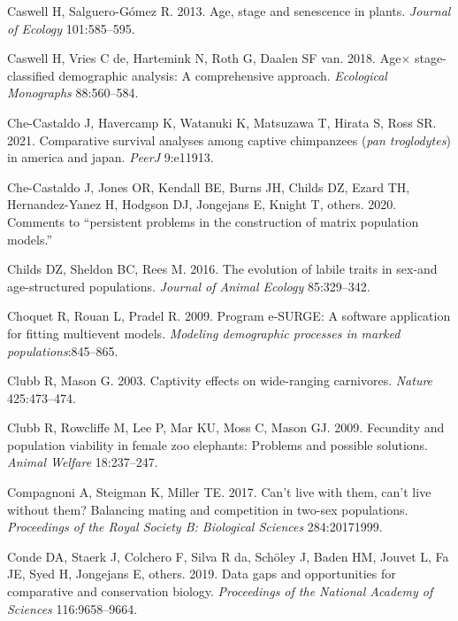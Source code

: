 \documentclass[
  12pt,
  letterpaper,
]{book}
\newlength{\cslhangindent}
\newenvironment{CSLReferences}[2] %
 {\begin{list}{}{%
  \setlength{\itemindent}{0pt}
  \setlength{\leftmargin}{0pt}
  \setlength{\parsep}{0pt}
  \ifodd #1
   \setlength{\leftmargin}{\cslhangindent}
   \setlength{\itemindent}{-1\cslhangindent}
  \fi
  \setlength{\itemsep}{#2\baselineskip}}}
 {\end{list}}
\begin{document}
\begin{CSLReferences}{1}{0}
Caswell H, Salguero-Gómez R. 2013. Age, stage and senescence in plants.
\emph{Journal of Ecology} 101:585--595.

Caswell H, Vries C de, Hartemink N, Roth G, Daalen SF van. 2018.
Age\(\times\) stage-classified demographic analysis: A comprehensive
approach. \emph{Ecological Monographs} 88:560--584.

Che-Castaldo J, Havercamp K, Watanuki K, Matsuzawa T, Hirata S, Ross SR.
2021. Comparative survival analyses among captive chimpanzees (\emph{pan
{t}roglodytes}) in america and japan. \emph{PeerJ} 9:e11913.

Che-Castaldo J, Jones OR, Kendall BE, Burns JH, Childs DZ, Ezard TH,
Hernandez-Yanez H, Hodgson DJ, Jongejans E, Knight T, others. 2020.
Comments to {``persistent problems in the construction of matrix
population models.''}

Childs DZ, Sheldon BC, Rees M. 2016. The evolution of labile traits in
sex-and age-structured populations. \emph{Journal of Animal Ecology}
85:329--342.

Choquet R, Rouan L, Pradel R. 2009. Program e-SURGE: A software
application for fitting multievent models. \emph{Modeling demographic
processes in marked populations}:845--865.

Clubb R, Mason G. 2003. Captivity effects on wide-ranging carnivores.
\emph{Nature} 425:473--474.

Clubb R, Rowcliffe M, Lee P, Mar KU, Moss C, Mason GJ. 2009. Fecundity
and population viability in female zoo elephants: Problems and possible
solutions. \emph{Animal Welfare} 18:237--247.

Compagnoni A, Steigman K, Miller TE. 2017. Can't live with them, can't
live without them? Balancing mating and competition in two-sex
populations. \emph{Proceedings of the Royal Society B: Biological
Sciences} 284:20171999.

Conde DA, Staerk J, Colchero F, Silva R da, Schöley J, Baden HM, Jouvet
L, Fa JE, Syed H, Jongejans E, others. 2019. Data gaps and opportunities
for comparative and conservation biology. \emph{Proceedings of the
National Academy of Sciences} 116:9658--9664.


\end{CSLReferences}
\end{document}
